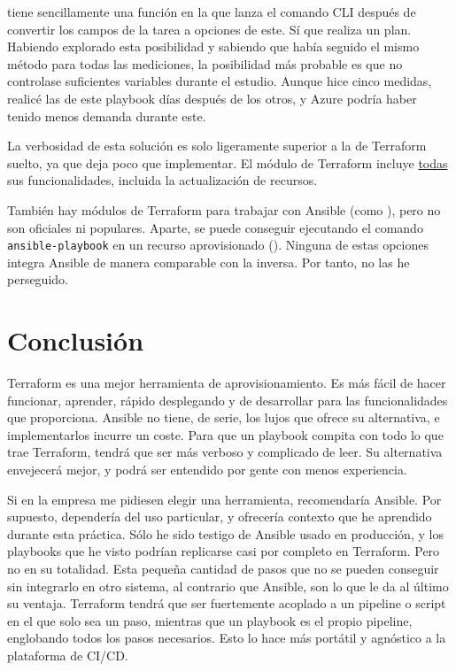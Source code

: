 \documentclass[11pt]{article}
\begin{document}
\begin{flushleft}
tiene sencillamente una función en la que lanza el comando CLI después de convertir los campos de la tarea a opciones de este. Sí que realiza un plan. Habiendo explorado esta posibilidad y sabiendo que había seguido el mismo método para todas las mediciones, la posibilidad más probable es que no controlase suficientes variables durante el estudio. Aunque hice cinco medidas, realicé las de este playbook días después de los otros, y Azure podría haber tenido menos demanda durante este.
\linebreak

La verbosidad de esta solución es solo ligeramente superior a la de Terraform suelto, ya que deja poco que implementar. El módulo de Terraform incluye \underline{todas} sus funcionalidades, incluida la actualización de recursos.
\linebreak

También hay módulos de Terraform para trabajar con Ansible (como \cite{terraform_ansible_cloud}), pero no son oficiales ni populares. Aparte, se puede conseguir ejecutando el comando \texttt{ansible-playbook} en un recurso aprovisionado (\cite{terraform_ansible_digitaloc}). Ninguna de estas opciones integra Ansible de manera comparable con la inversa. Por tanto, no las he perseguido.





\clearpage
\section{Conclusión}
Terraform es una mejor herramienta de aprovisionamiento. Es más fácil de hacer funcionar, aprender, rápido desplegando y de desarrollar para las funcionalidades que proporciona. Ansible no tiene, de serie, los lujos que ofrece su alternativa, e implementarlos incurre un coste. Para que un playbook compita con todo lo que trae Terraform, tendrá que ser más verboso y complicado de leer. Su alternativa envejecerá mejor, y podrá ser entendido por gente con menos experiencia.
\linebreak

Si en la empresa me pidiesen elegir una herramienta, recomendaría Ansible. Por supuesto, dependería del uso particular, y ofrecería contexto que he aprendido durante esta práctica. Sólo he sido testigo de Ansible usado en producción, y los playbooks que he visto podrían replicarse casi por completo en Terraform. Pero no en su totalidad. Esta pequeña cantidad de pasos que no se pueden conseguir sin integrarlo en otro sistema, al contrario que Ansible, son lo que le da al último su ventaja. Terraform tendrá que ser fuertemente acoplado a un pipeline o script en el que solo sea un paso, mientras que un playbook es el propio pipeline, englobando todos los pasos necesarios. Esto lo hace más portátil y agnóstico a la plataforma de CI/CD.
\linebreak


\end{flushleft}
\end{document}
